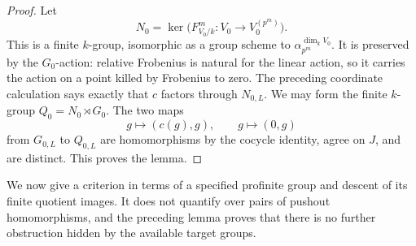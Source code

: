 \begin{proof}
Let
\[
N_0=\ker\bigl(F^m_{V_0/k}\colon V_0\to V_0^{(p^m)}\bigr).
\]
This is a finite $k$-group, isomorphic as a group scheme to
$\alpha_{p^m}^{\dim_k V_0}$.  It is preserved by the $G_0$-action:
relative Frobenius is natural for the linear action, so it carries
the action on a point killed by Frobenius to zero.  The preceding
coordinate calculation says exactly that $c$ factors through
$N_{0,L}$.  We may form the finite $k$-group
$Q_0=N_0\rtimes G_0$.  The two maps
\[
g\longmapsto(c(g),g),\qquad g\longmapsto(0,g)
\]
from $G_{0,L}$ to $Q_{0,L}$ are homomorphisms by the cocycle
identity, agree on $J$, and are distinct.  This proves the lemma.
\end{proof}

We now give a criterion in terms of a specified profinite group and
descent of its finite quotient images.  It does not quantify over
pairs of pushout homomorphisms, and the preceding lemma proves that
there is no further obstruction hidden by the available target
groups.

